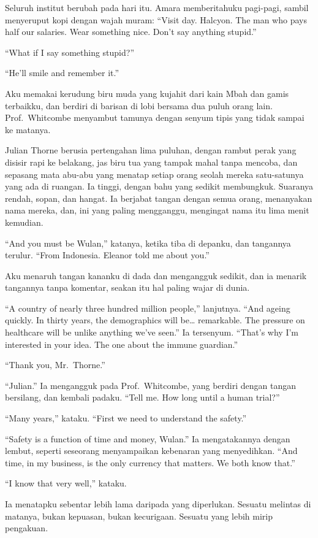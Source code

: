 \documentclass[11pt,twoside,openany]{book}
\begin{document}
Seluruh institut berubah pada hari itu. Amara memberitahuku pagi-pagi, sambil menyeruput kopi dengan wajah muram: ``Visit day. Halcyon. The man who pays half our salaries. Wear something nice. Don't say anything stupid.''

``What if I say something stupid?''

``He'll smile and remember it.''

Aku memakai kerudung biru muda yang kujahit dari kain Mbah dan gamis terbaikku, dan berdiri di barisan di lobi bersama dua puluh orang lain. Prof.~Whitcombe menyambut tamunya dengan senyum tipis yang tidak sampai ke matanya.

Julian Thorne berusia pertengahan lima puluhan, dengan rambut perak yang disisir rapi ke belakang, jas biru tua yang tampak mahal tanpa mencoba, dan sepasang mata abu-abu yang menatap setiap orang seolah mereka satu-satunya yang ada di ruangan. Ia tinggi, dengan bahu yang sedikit membungkuk. Suaranya rendah, sopan, dan hangat. Ia berjabat tangan dengan semua orang, menanyakan nama mereka, dan, ini yang paling mengganggu, mengingat nama itu lima menit kemudian.

``And you must be Wulan,'' katanya, ketika tiba di depanku, dan tangannya terulur. ``From Indonesia. Eleanor told me about you.''

Aku menaruh tangan kananku di dada dan mengangguk sedikit, dan ia menarik tangannya tanpa komentar, seakan itu hal paling wajar di dunia.

``A country of nearly three hundred million people,'' lanjutnya. ``And ageing quickly. In thirty years, the demographics will be\ldots{} remarkable. The pressure on healthcare will be unlike anything we've seen.'' Ia tersenyum. ``That's why I'm interested in your idea. The one about the immune guardian.''

``Thank you, Mr.~Thorne.''

``Julian.'' Ia mengangguk pada Prof.~Whitcombe, yang berdiri dengan tangan bersilang, dan kembali padaku. ``Tell me. How long until a human trial?''

``Many years,'' kataku. ``First we need to understand the safety.''

``Safety is a function of time and money, Wulan.'' Ia mengatakannya dengan lembut, seperti seseorang menyampaikan kebenaran yang menyedihkan. ``And time, in my business, is the only currency that matters. We both know that.''

``I know that very well,'' kataku.

Ia menatapku sebentar lebih lama daripada yang diperlukan. Sesuatu melintas di matanya, bukan kepuasan, bukan kecurigaan. Sesuatu yang lebih mirip pengakuan.
\end{document}
